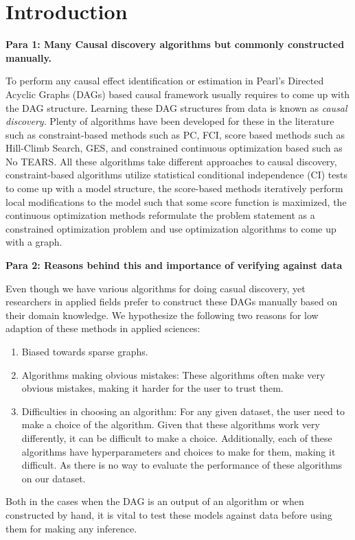 \documentclass{article}
\begin{document}
\section{Introduction}
\textbf{Para 1: Many Causal discovery algorithms but commonly constructed manually.}


To perform any causal effect identification or estimation in Pearl's Directed
Acyclic Graphs (DAGs) based causal framework usually requires to come up with
the DAG structure. Learning these DAG structures from data is known as
\emph{causal discovery}. Plenty of algorithms have been developed for these in
the literature such as constraint-based methods such as PC, FCI, score based
methods such as Hill-Climb Search, GES, and constrained continuous optimization
based such as No TEARS. All these algorithms take different approaches to
causal discovery, constraint-based algorithms utilize statistical conditional
independence (CI) tests to come up with a model structure, the score-based
methods iteratively perform local modifications to the model such that some
score function is maximized, the continuous optimization methods reformulate
the problem statement as a constrained optimization problem and use
optimization algorithms to come up with a graph.

\textbf{Para 2: Reasons behind this and importance of verifying against data}

Even though we have various algorithms for doing casual discovery, yet
researchers in applied fields prefer to construct these DAGs manually based on
their domain knowledge. We hypothesize the following two reasons for low
adaption of these methods in applied sciences:

\begin{enumerate}
	\item Biased towards sparse graphs.
	\item Algorithms making obvious mistakes: These algorithms often 
		make very obvious mistakes, making it harder for the user
		to trust them.
	\item Difficulties in choosing an algorithm: For any given dataset, the
		user need to make a choice of the algorithm. Given that these
		algorithms work very differently, it can be difficult to make a
		choice. Additionally, each of these algorithms have
		hyperparameters and choices to make for them, making it
		difficult. As there is no way to evaluate the performance of 
		these algorithms on our dataset.
\end{enumerate}
Both in the cases when the DAG is an output of an algorithm or when constructed
by hand, it is vital to test these models against data before using them for
making any inference. 
\end{document}
